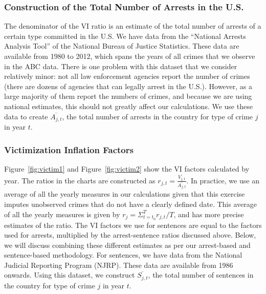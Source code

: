 \subsubsection{Construction of the Total Number of Arrests in the U.S.}
\noindent The denominator of the VI ratio is an estimate of the total number of arrests of a certain type committed in the U.S. We have data from the ``National Arrests Analysis Tool'' of the National Bureau of Justice Statistics. These data are available from 1980 to 2012, which spans the years of all crimes that we observe in the ABC data. There is one problem with this dataset that we consider relatively minor: not all law enforcement agencies report the number of crimes (there are dozens of agencies that can legally arrest in the U.S.). However, as a large majority of them report the numbers of crimes, and because we are using national estimates, this should not greatly affect our calculations. We use these data to create $\overline{A_{j,t}}$, the total number of arrests in the country for type of crime $j$ in year $t$. \\

\subsubsection{Victimization Inflation Factors} 

\noindent Figure~\ref{fig:victim1} and Figure~\ref{fig:victim2} show the VI factors calculated by year. The ratios in the charts are constructed as $r_{j,t}=\frac{\overline{V_{j,t}}}{\overline{A_{j,t}}}$. In practice, we use an average of all the yearly measures in our calculations given that this exercise imputes unobserved crimes that do not have a clearly defined date. This average of all the yearly measures is given by $r_j=\Sigma_{t=t_0}^{T}r_{j,t}/T$, and has more precise estimates of the ratio. The VI factors we use for sentences are equal to the factors used for arrests, multiplied by the arrest-sentence ratios discussed above. Below, we will discuss combining these different estimates as per our arrest-based and sentence-based methodology. For sentences, we have data from the National Judicial Reporting Program (NJRP). These data are available from 1986 onwards. Using this dataset, we construct $\overline{S_{j,t}}$, the total number of sentences in the country for type of crime $j$ in year $t$. \\

